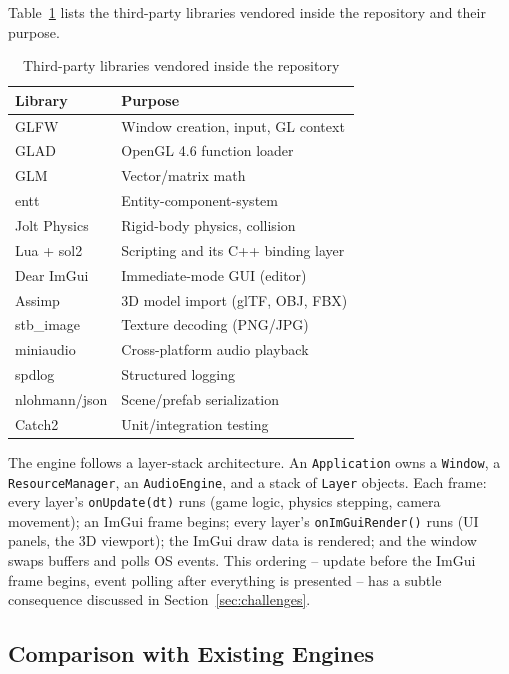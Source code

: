 \documentclass[conference]{IEEEtran}
\begin{document}
Table~\ref{tab:vendor} lists the third-party libraries vendored inside
the repository and their purpose.

\begin{table}[htbp]
\caption{Third-party libraries vendored inside the repository}
\label{tab:vendor}
\centering
\begin{tabular}{ll}
\toprule
\textbf{Library} & \textbf{Purpose} \\
\midrule
GLFW \cite{glfw} & Window creation, input, GL context \\
GLAD & OpenGL 4.6 function loader \\
GLM & Vector/matrix math \\
entt \cite{entt} & Entity-component-system \\
Jolt Physics \cite{jolt} & Rigid-body physics, collision \\
Lua + sol2 \cite{sol2} & Scripting and its C++ binding layer \\
Dear ImGui \cite{imgui} & Immediate-mode GUI (editor) \\
Assimp & 3D model import (glTF, OBJ, FBX) \\
stb\_image & Texture decoding (PNG/JPG) \\
miniaudio & Cross-platform audio playback \\
spdlog & Structured logging \\
nlohmann/json & Scene/prefab serialization \\
Catch2 & Unit/integration testing \\
\bottomrule
\end{tabular}
\end{table}

The engine follows a layer-stack architecture. An \texttt{Application}
owns a \texttt{Window}, a \texttt{ResourceManager}, an
\texttt{AudioEngine}, and a stack of \texttt{Layer} objects. Each frame:
every layer's \texttt{onUpdate(dt)} runs (game logic, physics stepping,
camera movement); an ImGui frame begins; every layer's
\texttt{onImGuiRender()} runs (UI panels, the 3D viewport); the ImGui
draw data is rendered; and the window swaps buffers and polls OS events.
This ordering -- update before the ImGui frame begins, event polling
after everything is presented -- has a subtle consequence discussed in
Section~\ref{sec:challenges}.

\subsection{Comparison with Existing Engines}
\label{sec:comparison}
\end{document}
